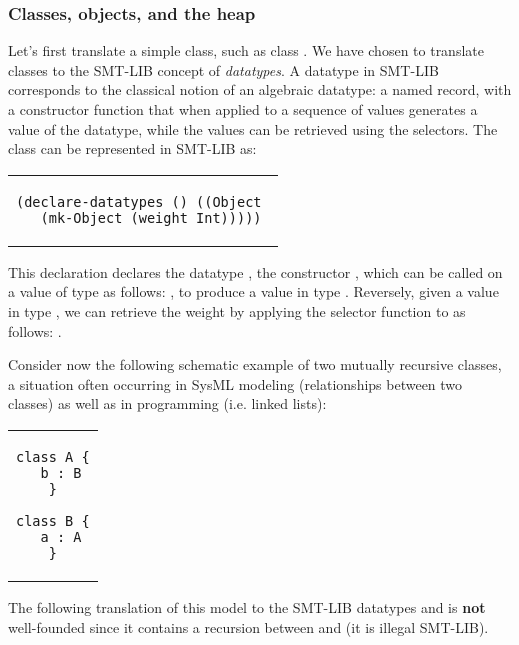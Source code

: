 \subsubsection{Classes, objects, and the heap}

Let's first translate a simple class, such as class .
We have chosen to translate classes to the SMT-LIB concept of {\em 
datatypes}. A datatype in SMT-LIB corresponds to the classical 
notion of an algebraic datatype: a named record, with a constructor 
function  that when applied to a sequence of values generates a 
value of the  datatype, while the values can be retrieved using the 
selectors.  The class  can be  represented in SMT-LIB 
as:

\lstset{language=SMT,numbers=none}

\begin{center}
\begin{tabular}{c}
\begin{lstlisting}
(declare-datatypes () ((Object 
  (mk-Object (weight Int)))))
\end{lstlisting}
\end{tabular}
\end{center}

This declaration declares the datatype , the 
constructor , which can be called on a value 
 of type  as follows: , to 
produce a value in type . Reversely, given a value 
 in type , we can retrieve the weight by 
applying the selector function  to  as 
follows: .

Consider now the following schematic example of two
mutually recursive classes, a situation often occurring in SysML modeling (relationships between two classes) as well as in programming (i.e. linked lists):

\lstset{language=K}

\begin{center}
\begin{tabular}{c}
\begin{lstlisting}
class A {
  b : B
}

class B {
  a : A
}
\end{lstlisting}
\end{tabular}
\end{center}

The following translation of this model to the SMT-LIB datatypes  and  is {\bf not} well-founded since it contains a recursion between  and  (it is illegal SMT-LIB).

